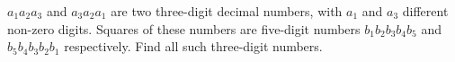 $a_1a_2a_3$ and $a_3a_2a_1$ are two three-digit decimal numbers, with $a_1$ and $a_3$ different non-zero digits. Squares of these numbers are five-digit numbers $b_1b_2b_3b_4b_5$ and $b_5b_4b_3b_2b_1$ respectively. Find all such three-digit numbers.